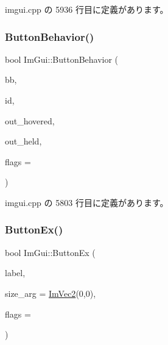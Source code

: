  imgui.\+cpp の 5936 行目に定義があります。

\mbox{\label{namespace_im_gui_a65a4f18b1bc8ce0f351687922089f374}} 
\subsubsection{\texorpdfstring{Button\+Behavior()}{ButtonBehavior()}}
{\footnotesize\ttfamily bool Im\+Gui\+::\+Button\+Behavior (\begin{DoxyParamCaption}\item[{const \mbox{\hyperlink{struct_im_rect}{Im\+Rect}} \&}]{bb,  }\item[{\mbox{\hyperlink{imgui_8h_a1785c9b6f4e16406764a85f32582236f}{Im\+Gui\+ID}}}]{id,  }\item[{bool $\ast$}]{out\+\_\+hovered,  }\item[{bool $\ast$}]{out\+\_\+held,  }\item[{\mbox{\hyperlink{imgui__internal_8h_a990fae518aa1d95f571ee40989de4c22}{Im\+Gui\+Button\+Flags}}}]{flags = {} }\end{DoxyParamCaption})}



 imgui.\+cpp の 5803 行目に定義があります。

\mbox{\label{namespace_im_gui_ae479220c66b039874c6e4c9e9b22849f}} 
\subsubsection{\texorpdfstring{Button\+Ex()}{ButtonEx()}}
{\footnotesize\ttfamily bool Im\+Gui\+::\+Button\+Ex (\begin{DoxyParamCaption}\item[{const char $\ast$}]{label,  }\item[{const \mbox{\hyperlink{struct_im_vec2}{Im\+Vec2}} \&}]{size\+\_\+arg = {\ttfamily \mbox{\hyperlink{struct_im_vec2}{Im\+Vec2}}(0,0)},  }\item[{\mbox{\hyperlink{imgui__internal_8h_a990fae518aa1d95f571ee40989de4c22}{Im\+Gui\+Button\+Flags}}}]{flags = {} }\end{DoxyParamCaption})}



